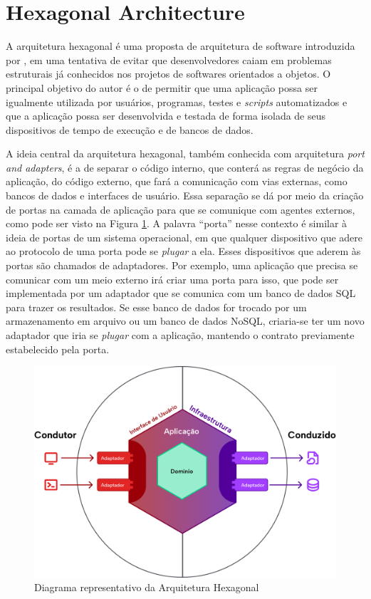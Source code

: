 \documentclass[12pt, %
openright, 
oneside, %
a4paper,    %
brazil]{facom-ufu-abntex2}
\begin{document}
\section{Hexagonal Architecture}
A arquitetura hexagonal é uma proposta de arquitetura de software introduzida por , em uma tentativa de evitar que desenvolvedores caiam em problemas estruturais já conhecidos nos projetos de softwares orientados a objetos. O principal objetivo do autor é o de permitir que uma aplicação possa ser igualmente utilizada por usuários, programas, testes e \textit{scripts} automatizados e que a aplicação possa ser desenvolvida e testada de forma isolada de seus dispositivos de tempo de execução e de bancos de dados.

A ideia central da arquitetura hexagonal, também conhecida com arquitetura \textit{port and adapters}, é a de separar o código interno, que conterá as regras de negócio da aplicação, do código externo, que fará a comunicação com vias externas, como bancos de dados e interfaces de usuário. Essa separação se dá por meio da criação de portas na camada de aplicação para que se comunique com agentes externos, como pode ser visto na Figura \ref{fig:hex_arch_diagram}. A palavra ``porta'' nesse contexto é similar à ideia de portas de um sistema operacional, em que qualquer dispositivo que adere ao protocolo de uma porta pode se \textit{plugar} a ela. Esses dispositivos que aderem às portas são chamados de adaptadores. Por exemplo, uma aplicação que precisa se comunicar com um meio externo irá criar uma porta para isso, que pode ser implementada por um adaptador que se comunica com um banco de dados SQL para trazer os resultados. Se esse banco de dados for trocado por um armazenamento em arquivo ou um banco de dados NoSQL, criaria-se ter um novo adaptador que iria se \textit{plugar} com a aplicação, mantendo o contrato previamente estabelecido pela porta.

\begin{figure}[ht]
    \centering
    \includegraphics[width=.6\textwidth]{figures/bibliographical_review/hex_arch_diagram.png}
    \caption{Diagrama representativo da Arquitetura Hexagonal}
    \label{fig:hex_arch_diagram}
\end{figure}
\end{document}
